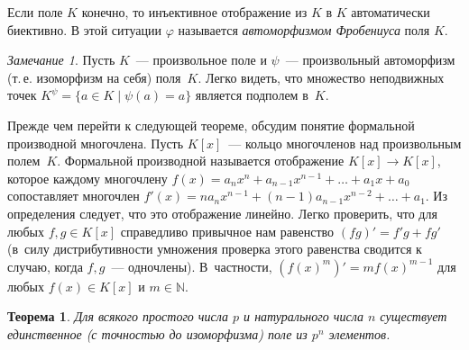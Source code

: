 \documentclass[a4paper,10pt]{amsart}
\def\NN{{\mathbb N}}%
\newtheorem{theorem}{Теорема}
\theoremstyle{definition}
\theoremstyle{remark}
\newtheorem{remark}{Замечание}
\begin{document}
Если поле $K$ конечно, то инъективное отображение из $K$ в $K$
автоматически биективно. В этой ситуации $\varphi$ называется {\it
автоморфизмом Фробениуса} поля $K$.

\begin{remark}
Пусть $K$~--- произвольное поле и $\psi$~--- произвольный
автоморфизм (т.\,е. изоморфизм на себя) поля~$K$. Легко видеть, что
множество неподвижных точек $K^{\psi} = \{ a \in K \mid \psi(a) =
a\}$ является подполем в~$K$.
\end{remark}

Прежде чем перейти к следующей теореме, обсудим понятие формальной
производной многочлена. Пусть $K[x]$~--- кольцо многочленов над
произвольным полем~$K$. Формальной производной называется
отображение $K[x] \to K[x]$, которое каждому многочлену $f(x) =
a_nx^n + a_{n-1}x^{n-1} + \ldots + a_1 x + a_0$ сопоставляет
многочлен $f'(x) = na_n x^{n-1} + (n-1)a_{n-1}x^{n-2} + \ldots +
a_1$. Из определения следует, что это отображение линейно. Легко
проверить, что для любых $f,g \in K[x]$ справедливо привычное нам
равенство $(fg)' = f'g + fg'$ (в~силу дистрибутивности умножения
проверка этого равенства сводится к случаю, когда $f,g$~---
одночлены). В~частности, $(f(x)^m)' = mf(x)^{m-1}$ для любых $f(x)
\in K[x]$ и $m \in \NN$.

\begin{theorem} \label{thm2}
Для всякого простого числа $p$ и натурального числа $n$ существует
единственное \textup(с точностью до изоморфизма\textup) поле из
$p^n$ элементов.
\end{theorem}
\end{document}
